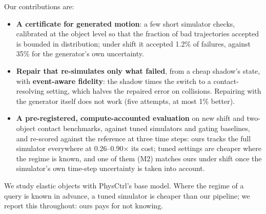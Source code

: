 Our contributions are:
\begin{itemize}
\item \textbf{A certificate for generated motion}: a few short simulator checks, calibrated at the object level so that the fraction of bad trajectories accepted is bounded in distribution; under shift it accepted 1.2\% of failures, against 35\% for the generator's own uncertainty.
\item \textbf{Repair that re-simulates only what failed}, from a cheap shadow's state, with \textbf{event-aware fidelity}: the shadow times the switch to a contact-resolving setting, which halves the repaired error on collisions. Repairing with the generator itself does not work (five attempts, at most 1\% better).
\item \textbf{A pre-registered, compute-accounted evaluation} on new shift and two-object contact benchmarks, against tuned simulators and gating baselines, and re-scored against the reference at three time steps: ours tracks the full simulator everywhere at 0.26--0.90$\times$ its cost; tuned settings are cheaper where the regime is known, and one of them (M2) matches ours under shift once the simulator's own time-step uncertainty is taken into account.
\end{itemize}

We study elastic objects with PhysCtrl's base model. Where the regime of a query is known in advance, a tuned simulator is cheaper than our pipeline; we report this throughout: ours pays for not knowing.
